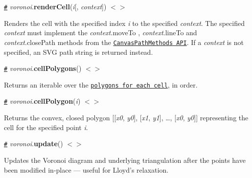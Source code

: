 \href{#voronoi_renderCell}{\tt \#} {\itshape voronoi}.{\bfseries render\+Cell}({\itshape i}\mbox{[}, {\itshape context}\mbox{]}) \href{https://github.com/d3/d3-delaunay/blob/master/src/voronoi.js}{\tt $<$$>$}



Renders the cell with the specified index {\itshape i} to the specified {\itshape context}. The specified {\itshape context} must implement the {\itshape context}.move\+To , {\itshape context}.line\+To and {\itshape context}.close\+Path methods from the \href{https://www.w3.org/TR/2dcontext/#canvaspathmethods}{\tt Canvas\+Path\+Methods A\+PI}. If a {\itshape context} is not specified, an S\+VG path string is returned instead.

\href{#voronoi_cellPolygons}{\tt \#} {\itshape voronoi}.{\bfseries cell\+Polygons}() \href{https://github.com/d3/d3-delaunay/blob/master/src/voronoi.js}{\tt $<$$>$}

Returns an iterable over the \href{#voronoi_cellPolygon}{\tt polygons for each cell}, in order.

\href{#voronoi_cellPolygon}{\tt \#} {\itshape voronoi}.{\bfseries cell\+Polygon}({\itshape i}) \href{https://github.com/d3/d3-delaunay/blob/master/src/voronoi.js}{\tt $<$$>$}

Returns the convex, closed polygon \mbox{[}\mbox{[}{\itshape x0}, {\itshape y0}\mbox{]}, \mbox{[}{\itshape x1}, {\itshape y1}\mbox{]}, …, \mbox{[}{\itshape x0}, {\itshape y0}\mbox{]}\mbox{]} representing the cell for the specified point {\itshape i}.

\href{#voronoi_update}{\tt \#} {\itshape voronoi}.{\bfseries update}() \href{https://github.com/d3/d3-delaunay/blob/master/src/voronoi.js}{\tt $<$$>$}

Updates the Voronoi diagram and underlying triangulation after the points have been modified in-\/place — useful for Lloyd’s relaxation. 